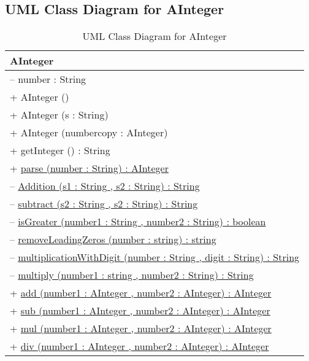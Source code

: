 \documentclass[a4paper,12pt]{article}
\begin{document}
{\subsection{UML Class Diagram for AInteger}

\begin{table}[h!]
\centering
\begin{tabular}{|l|}
\hline
\textbf{AInteger}\\
\hline
-- number : String\\
\hline
+ AInteger () \\
+ AInteger (s : String) \\
+ AInteger (numbercopy : AInteger)\\
+ getInteger () : String \\
+ \underline{parse (number : String) : AInteger} \\
-- \underline{Addition (s1 : String , s2 : String) : String} \\
-- \underline{subtract (s2 : String , s2 : String) : String} \\
-- \underline{isGreater (number1 : String , number2 : String) : boolean }\\
-- \underline{removeLeadingZeros (number : string) : string} \\
-- \underline{multiplicationWithDigit (number : String , digit : String) : String} \\
-- \underline{multiply (number1 : string , number2 : String) : String} \\
+ \underline{add (number1 : AInteger , number2 : AInteger) : AInteger} \\
+ \underline{sub (number1 : AInteger , number2 : AInteger) : AInteger} \\
+ \underline{mul (number1 : AInteger , number2 : AInteger) : AInteger} \\
+ \underline{div (number1 : AInteger , number2 : AInteger) : AInteger} \\
\hline
\end{tabular}
\caption{UML Class Diagram for AInteger}
\end{table}

}
\end{document}
